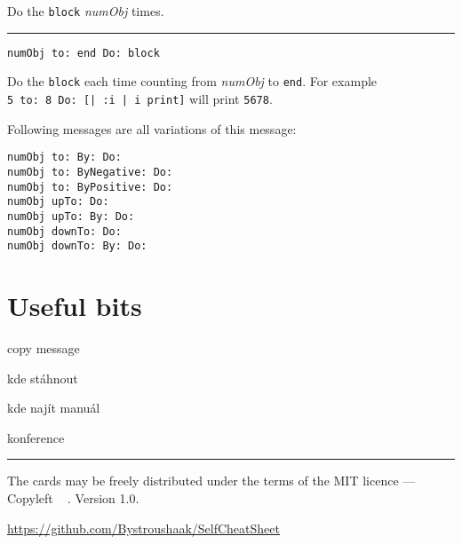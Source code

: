 \documentclass[10pt]{article}
\begin{document}
\begin{multicols*}{3}
Do the \texttt{block} \textit{numObj} times.

\vspace*{0.2cm}
\hrule

\begin{lstlisting}
numObj to: end Do: block
\end{lstlisting}

Do the \texttt{block} each time counting from \textit{numObj} to \texttt{end}. For example \texttt{5\ to:\ 8\ Do:\ [|\ :i\ |\ i\ print]} will print \texttt{5678}.

Following messages are all variations of this message:

\begin{lstlisting}
numObj to: By: Do:
numObj to: ByNegative: Do:
numObj to: ByPositive: Do:
numObj upTo: Do:
numObj upTo: By: Do:
numObj downTo: Do:
numObj downTo: By: Do:
\end{lstlisting}




\section{Useful bits}
copy message

kde stáhnout

kde najít manuál

konference

\vfill
\hrule
\smallskip

{\small
The cards may be freely distributed under
the terms of the MIT licence ---
Copyleft \textcopyleft\ \thedate{} \href{http://kitakitsune.org}{\theauthor}. Version 1.0.

\url{https://github.com/Bystroushaak/SelfCheatSheet}
}

\end{multicols*}
\end{document}
